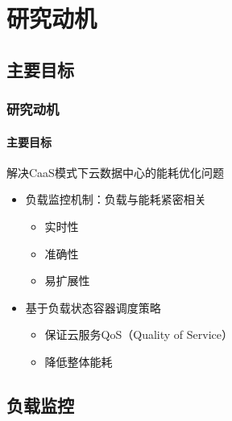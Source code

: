 \section{研究动机}

\subsection{主要目标}

\begin{frame}
\frametitle{研究动机}
\framesubtitle{主要目标}
\begin{block}{解决CaaS模式下云数据中心的能耗优化问题}
    \begin{itemize}
        \item 负载监控机制：负载与能耗紧密相关
        \begin{itemize}
            \item 实时性
            \item 准确性
            \item 易扩展性
        \end{itemize}
        \item 基于负载状态容器调度策略
        \begin{itemize}
            \item 保证云服务QoS（Quality of Service）
            \item 降低整体能耗
        \end{itemize}
    \end{itemize}
\end{block}
\end{frame}

\subsection{负载监控}

